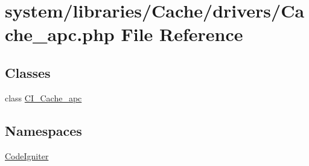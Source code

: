 \hypertarget{_cache__apc_8php}{}\section{system/libraries/\+Cache/drivers/\+Cache\+\_\+apc.php File Reference}
\label{_cache__apc_8php}
\subsection*{Classes}
\begin{DoxyCompactItemize}
\item 
class \mbox{\hyperlink{class_c_i___cache__apc}{C\+I\+\_\+\+Cache\+\_\+apc}}
\end{DoxyCompactItemize}
\subsection*{Namespaces}
\begin{DoxyCompactItemize}
\item 
 \mbox{\hyperlink{namespace_code_igniter}{Code\+Igniter}}
\end{DoxyCompactItemize}
